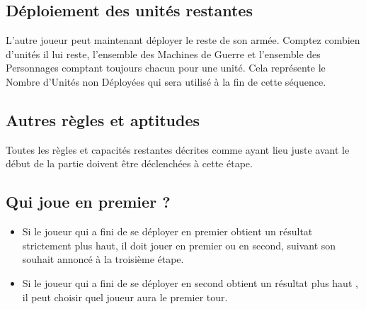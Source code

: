 \hypertarget{deployremainingunits}{\subsection{Déploiement des unités restantes}}

L'autre joueur peut maintenant déployer le reste de son armée. Comptez combien d'unités il lui reste, l'ensemble des Machines de Guerre et l'ensemble des Personnages comptant toujours chacun pour une unité. Cela représente le \og Nombre d'Unités non Déployées \fg{} qui sera utilisé à la fin de cette séquence.

\subsection{Autres règles et aptitudes}

Toutes les règles et capacités restantes décrites comme ayant lieu juste avant le début de la partie doivent être déclenchées à cette étape.

\newpage
\hypertarget{rollforfirstturn}{\subsection{Qui joue en premier ?}}

\begin{itemize}[label={-}]
\item Si le joueur qui a fini de se déployer en premier obtient un résultat strictement plus haut, il doit jouer en premier ou en second, suivant son souhait annoncé à la troisième étape.
\item Si le joueur qui a fini de se déployer en second obtient un résultat plus haut , il peut choisir quel joueur aura le premier tour.
\end{itemize}


